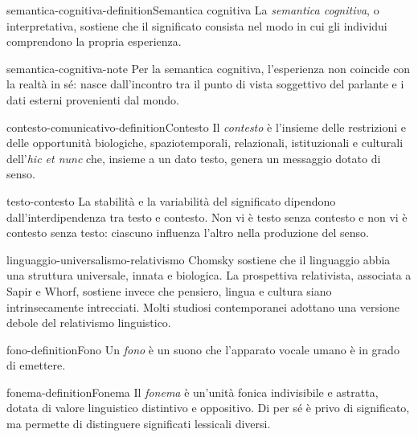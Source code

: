 \documentclass[preview]{standalone}
\begin{document}
\begin{snippetdefinition}{semantica-cognitiva-definition}{Semantica cognitiva}
    La \emph{semantica cognitiva}, o interpretativa, sostiene che il significato
    consista nel modo in cui gli individui comprendono la propria esperienza.
\end{snippetdefinition}

\begin{snippet}{semantica-cognitiva-note}
    Per la semantica cognitiva, l'esperienza non coincide con la realtà in sé:
    nasce dall'incontro tra il punto di vista soggettivo del parlante e i dati
    esterni provenienti dal mondo.
\end{snippet}

\begin{snippetdefinition}{contesto-comunicativo-definition}{Contesto}
    Il \emph{contesto} è l'insieme delle restrizioni e delle opportunità
    biologiche, spaziotemporali, relazionali, istituzionali e culturali
    dell'\emph{hic et nunc} che, insieme a un dato testo, genera un messaggio
    dotato di senso.
\end{snippetdefinition}

\begin{snippet}{testo-contesto}
    La stabilità e la variabilità del significato dipendono
    dall'interdipendenza tra testo e contesto. Non vi è testo senza contesto e
    non vi è contesto senza testo: ciascuno influenza l'altro nella produzione
    del senso.
\end{snippet}

\begin{snippet}{linguaggio-universalismo-relativismo}
    Chomsky sostiene che il linguaggio abbia una struttura universale, innata e
    biologica. La prospettiva relativista, associata a Sapir e Whorf, sostiene
    invece che pensiero, lingua e cultura siano intrinsecamente intrecciati.
    Molti studiosi contemporanei adottano una versione debole del relativismo
    linguistico.
\end{snippet}

\begin{snippetdefinition}{fono-definition}{Fono}
    Un \emph{fono} è un suono che l'apparato vocale umano è in grado di emettere.
\end{snippetdefinition}

\begin{snippetdefinition}{fonema-definition}{Fonema}
    Il \emph{fonema} è un'unità fonica indivisibile e astratta, dotata di valore
    linguistico distintivo e oppositivo. Di per sé è privo di significato, ma
    permette di distinguere significati lessicali diversi.
\end{snippetdefinition}
\end{document}
